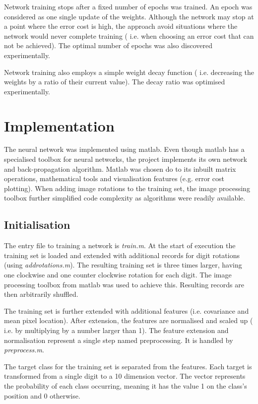 \documentclass[11]{article}
\begin{document}
Network training stops after a fixed number of epochs was trained. An epoch was considered as one single update of the weights. Although the network may stop at a point where the error cost is high, the approach avoid situations where the network would never complete training ( i.e. when choosing an error cost that can not be achieved). The optimal number of epochs was also discovered experimentally. 

Network training also employs a simple weight decay function ( i.e. decreasing the weights by a ratio of their current value). The decay ratio was optimised experimentally. 

\section{Implementation}

The neural network was implemented using matlab. Even though matlab has a specialised toolbox for neural networks, the project implements its own network and back-propagation algorithm. Matlab was chosen do to its inbuilt matrix operations, mathematical tools and visualisation features (e.g. error cost plotting). When adding image rotations to the training set, the image processing toolbox further simplified code complexity as algorithms were readily available.

\subsection{Initialisation}

The entry file to training a network is \emph{train.m}. At the start of execution the training set is loaded and extended with additional records for digit rotations (using \emph{addrotations.m}). The resulting training set is three times larger, having one clockwise and one counter clockwise rotation for each digit. The image processing toolbox from matlab was used to achieve this. Resulting records are then arbitrarily shuffled.

The  training set is further extended with additional features (i.e. covariance and mean pixel location). After extension, the features are normalised and scaled up ( i.e. by multiplying by a number larger than 1). The feature extension and normalisation represent a single step named preprocessing. It is handled by \emph{preprocess.m}.

The target class for the training set is separated from the features. Each target is transformed from a single digit to a 10 dimension vector. The vector represents the probability of each class occurring, meaning it has the value 1 on the class's position and 0 otherwise. 
\end{document}
